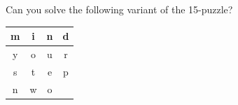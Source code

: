 \begin{bonus}
\label{xca:15tricky}
    Can you solve the following variant of the
    15-puzzle?

    \bigskip 
    \begin{center}
        \begin{tabular}{|c|c|c|c|}
            \hline
            \textsf{m} & \textsf{i} & \textsf{n} & \textsf{d}\\
            \hline
            \textsf{y} & \textsf{o} & \textsf{u} & \textsf{r}\\
            \hline
            \textsf{s} & \textsf{t} & \textsf{e} & \textsf{p}\\
            \hline
            \textsf{n} & \textsf{w} & \textsf{o} & \\
            \hline
        \end{tabular}
    \end{center}
    \bigskip 
\end{bonus}